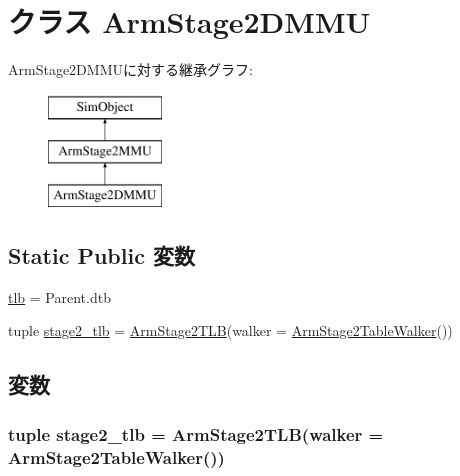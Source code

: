 \hypertarget{classArmTLB_1_1ArmStage2DMMU}{
\section{クラス ArmStage2DMMU}
\label{classArmTLB_1_1ArmStage2DMMU}
}
ArmStage2DMMUに対する継承グラフ:\begin{figure}[H]
\begin{center}
\leavevmode
\includegraphics[height=3cm]{classArmTLB_1_1ArmStage2DMMU}
\end{center}
\end{figure}
\subsection*{Static Public 変数}
\begin{DoxyCompactItemize}
\item 
\hyperlink{classArmTLB_1_1ArmStage2DMMU_aca6615da7b6b14e4b80293f21e77790c}{tlb} = Parent.dtb
\item 
tuple \hyperlink{classArmTLB_1_1ArmStage2DMMU_a9909fd406bc2a10a29e8593c7fccf8b4}{stage2\_\-tlb} = \hyperlink{classArmTLB_1_1ArmStage2TLB}{ArmStage2TLB}(walker = \hyperlink{classArmTLB_1_1ArmStage2TableWalker}{ArmStage2TableWalker}())
\end{DoxyCompactItemize}


\subsection{変数}
\hypertarget{classArmTLB_1_1ArmStage2DMMU_a9909fd406bc2a10a29e8593c7fccf8b4}{
\subsubsection[{stage2\_\-tlb}]{\setlength{\rightskip}{0pt plus 5cm}tuple {\bf stage2\_\-tlb} = {\bf ArmStage2TLB}(walker = {\bf ArmStage2TableWalker}())}}
\label{classArmTLB_1_1ArmStage2DMMU_a9909fd406bc2a10a29e8593c7fccf8b4}


